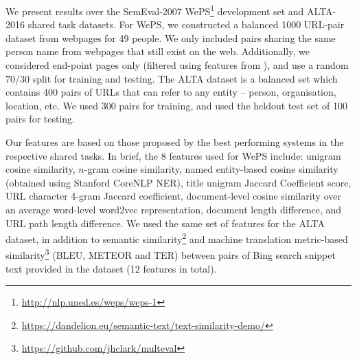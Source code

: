 \documentclass[letterpaper]{sig-alternate-2013}
\begin{document}
We present results over the SemEval-2007 WePS\footnote{\url{http://nlp.uned.es/weps/weps-1}} development set and ALTA-2016 shared task datasets. For WePS, we constructed a balanced 1000 URL-pair dataset from webpages for 49 people. We only included pairs sharing the same person name from webpages that still exist on the web. Additionally, we considered end-point pages only (filtered using features from \cite{chisholm2016akbc}), and use a random 70/30 split for training and testing. The ALTA dataset is a balanced set which contains 400 pairs of URLs that can refer to any entity -- person, organisation, location, etc. We used 300 pairs for training, and used the heldout test set of 100 pairs for testing. 

Our features are based on those proposed by the best performing systems in the respective shared tasks. In brief, the 8 features used for WePS include: unigram cosine similarity, $n$-gram cosine similarity,
named entity-based cosine similarity (obtained using Stanford CoreNLP NER), title unigram Jaccard Coefficient score, URL character 4-gram Jaccard coefficient, document-level cosine similarity over an average word-level word2vec representation, document length difference, and URL path length difference. We used the same set of features for the ALTA dataset, in addition to semantic similarity\footnote{\url{https://dandelion.eu/semantic-text/text-similarity-demo/}} and machine translation metric-based similarity\footnote{\url{https://github.com/jhclark/multeval}} (BLEU, METEOR and TER) between pairs of Bing search snippet text provided in the dataset (12 features in total).
\end{document}
